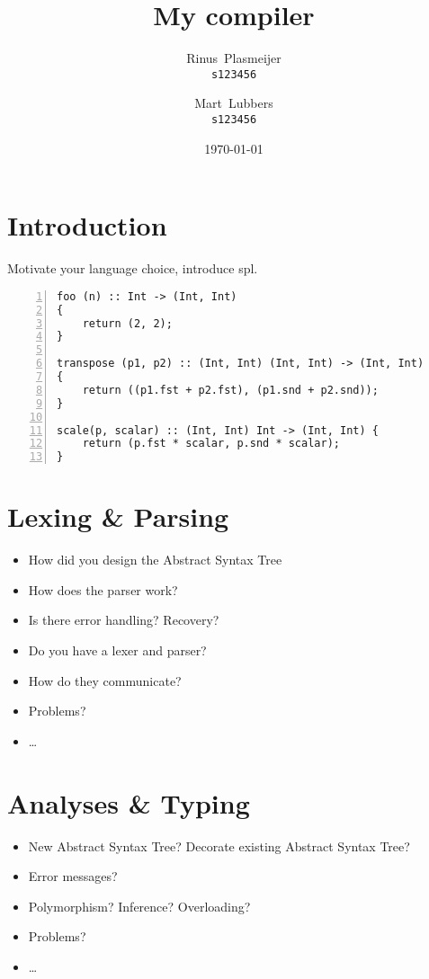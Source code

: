 \documentclass{report}
\author{%
	Rinus~Plasmeijer\\
	\small\texttt{s123456}\and
	Mart~Lubbers\\
	\small\texttt{s123456}
}
\date{\today}
\title{My compiler}
\begin{document}
\maketitle%

\tableofcontents%

\chapter{Introduction}
Motivate your language choice, introduce spl.

\begin{lstlisting}[language=SPL,numbers=left]
foo (n) :: Int -> (Int, Int)
{
	return (2, 2);
}

transpose (p1, p2) :: (Int, Int) (Int, Int) -> (Int, Int)
{
	return ((p1.fst + p2.fst), (p1.snd + p2.snd));
}

scale(p, scalar) :: (Int, Int) Int -> (Int, Int) {
	return (p.fst * scalar, p.snd * scalar);
}
\end{lstlisting}

\chapter{Lexing \& Parsing}
\begin{itemize}
	\item How did you design the Abstract Syntax Tree
	\item How does the parser work?
	\item Is there error handling? Recovery?
	\item Do you have a lexer and parser?
	\item How do they communicate?
	\item Problems?
	\item\ldots
\end{itemize}

\chapter{Analyses \& Typing}
\begin{itemize}
	\item New Abstract Syntax Tree? Decorate existing Abstract Syntax Tree?
	\item Error messages?
	\item Polymorphism? Inference? Overloading?
	\item Problems?
	\item\ldots
\end{itemize}
\end{document}
